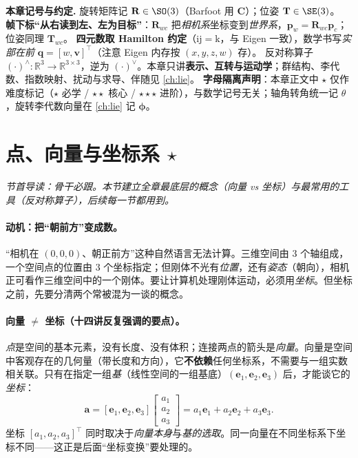 \begin{note}
\textbf{本章记号与约定.}\;
旋转矩阵记 $\mathbf{R}\in\SO(3)$（Barfoot\cite{barfoot2024state} 用 $\mathbf{C}$）；位姿 $\mathbf{T}\in\SE(3)$。
\textbf{帧下标“从右读到左、左为目标”}：$\mathbf{R}_{wc}$ 把\emph{相机系}坐标变到\emph{世界系}，$\mathbf{p}_w=\mathbf{R}_{wc}\mathbf{p}_c$；位姿同理 $\mathbf{T}_{wc}$。
\textbf{四元数取 Hamilton 约定}（$\mathrm{ij}=\mathrm{k}$，与 Eigen 一致），数学书写\emph{实部在前} $\mathbf{q}=[w,\mathbf{v}]^\top$（注意 Eigen 内存按 $(x,y,z,w)$ 存）。
反对称算子 $(\cdot)^\wedge:\mathbb{R}^3\to\mathbb{R}^{3\times3}$，逆为 $(\cdot)^\vee$。本章只讲\textbf{表示、互转与运动学}；群结构、李代数、指数映射、扰动与求导、伴随见 \cref{ch:lie}。
\textbf{字母隔离声明}：本章正文中 $\star$ 仅作难度标记（$\star$ 必学 / $\star\star$ 核心 / $\star\star\star$ 进阶），与数学记号无关；轴角转角统一记 $\theta$，旋转李代数向量在 \cref{ch:lie} 记 $\boldsymbol{\phi}$。
\end{note}

\section{点、向量与坐标系 \texorpdfstring{$\star$}{*}}
\label{sec:rb-vector}
\noindent\emph{节首导读：骨干必跟。本节建立全章最底层的概念（向量 vs 坐标）与最常用的工具（反对称算子），后续每一节都用到。}

\paragraph{动机：把“朝前方”变成数。}
“相机在 $(0,0,0)$、朝正前方”这种自然语言无法计算。三维空间由 $3$ 个轴组成，一个空间点的位置由 $3$ 个坐标指定；但刚体不光有\emph{位置}，还有\emph{姿态}（朝向），相机正可看作三维空间中的一个刚体\cite{gaoxiang2019slam14}。要让计算机处理刚体运动，必须用\emph{坐标}。但坐标之前，先要分清两个常被混为一谈的概念。

\paragraph{向量 $\neq$ 坐标（十四讲反复强调的要点）。}
\emph{点}是空间的基本元素，没有长度、没有体积；连接两点的箭头是\emph{向量}。向量是空间中客观存在的几何量（带长度和方向），它\textbf{不依赖}任何坐标系，不需要与一组实数相关联。只有在指定一组\emph{基}（线性空间的一组基底）$(\mathbf{e}_1,\mathbf{e}_2,\mathbf{e}_3)$ 后，才能谈它的\emph{坐标}：
\begin{equation}
  \mathbf{a}=[\mathbf{e}_1,\mathbf{e}_2,\mathbf{e}_3]\begin{bmatrix}a_1\\a_2\\a_3\end{bmatrix}=a_1\mathbf{e}_1+a_2\mathbf{e}_2+a_3\mathbf{e}_3.
  \label{eq:coord}
\end{equation}
坐标 $[a_1,a_2,a_3]^\top$ 同时取决于\emph{向量本身}与\emph{基的选取}。同一向量在不同坐标系下坐标不同——这正是后面“坐标变换”要处理的。

